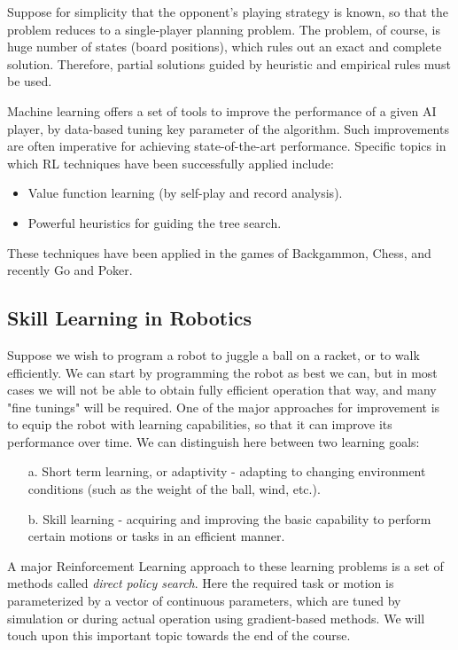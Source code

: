 Suppose for simplicity that the opponent's playing strategy is known, so that the problem reduces to a single-player planning problem. The problem, of course, is huge number of states (board positions), which rules out an exact and complete solution. Therefore, partial solutions guided by heuristic and empirical rules must be used.

Machine learning offers a set of tools to improve the performance of a given AI player, by data-based tuning key parameter of the algorithm. Such improvements are often imperative for achieving state-of-the-art performance. Specific topics in which RL techniques have been successfully applied include:

\begin{itemize}
  \item Value function learning (by self-play and record analysis).
  \item Powerful heuristics for guiding the tree search.
\end{itemize}
These techniques have been applied in the games of Backgammon, Chess, and recently Go and Poker.

\subsection{Skill Learning in Robotics}
Suppose we wish to program a robot to juggle a ball on a racket, or to walk efficiently. We can start by programming the robot as best we can, but in most cases we will not be able to obtain fully efficient operation that way, and many "fine tunings" will be required.  One of the major approaches for improvement is to equip the robot with learning capabilities, so that it can improve its performance over time.
We can distinguish here between two learning goals:
\begin{enumerate}
\item[a.] Short term learning, or adaptivity - adapting to changing environment conditions (such as the weight of the ball, wind, etc.).
\item[b.] Skill learning - acquiring and improving the basic capability to perform certain motions or tasks in an efficient manner.
\end{enumerate}

A major Reinforcement Learning approach to these learning problems is a set of methods called \emph{direct policy search}. Here the required task or motion is parameterized by a vector of continuous parameters, which are tuned by simulation or during actual operation using gradient-based methods.  We will touch upon this important topic towards the end of the course.


